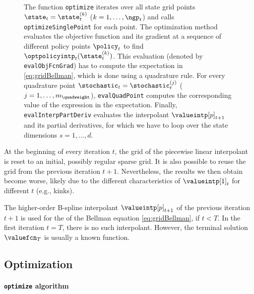 \begin{figure}
{    The function \texttt{optimize} iterates over all state grid points
    $\state_t = \state_t^{(k)}$ ($k = 1, \dotsc, \ngp_t$)
    and calls \texttt{optimizeSinglePoint} for each point.
    The optimization method evaluates the objective function and
    its gradient at a sequence of different policy points $\policy_t$
    to find $\optpolicyintp_t(\state_t^{(k)})$.
    This evaluation (denoted by \texttt{evalObjFcnGrad})
    has to compute the expectation in \cref{eq:gridBellman},
    which is done using a quadrature rule.
    For every quadrature point $\stochastic_t = \stochastic_t^{(j)}$
    ($j = 1, \dotsc, m_{\quadweight}$),
    \texttt{evalQuadPoint} computes the corresponding value of
    the expression in the expectation.
    Finally, \texttt{evalInterpPartDeriv} evaluates the interpolant
    $\valueintp[p]_{t+1}$ and its partial derivatives,
    for which we have to loop over the state dimensions $s = 1, \dotsc, d$.%
  }%
  \label{fig:structureSolveValueFunction}%
\end{figure}

At the beginning of every iteration $t$,
the grid of the piecewise linear interpolant is reset
to an initial, possibly regular sparse grid.
It is also possible to reuse the grid from the
previous iteration $t + 1$.
Nevertheless, the results we then obtain become worse,
likely due to the different characteristics of $\valueintp[1]_t$
for different $t$ (e.g., kinks).

The higher-order B-spline interpolant
$\valueintp[p]_{t+1}$ of the previous iteration $t+1$ is used
for the \rhs of the Bellman equation \eqref{eq:gridBellman},
if $t < T$.
In the first iteration $t = T$,
there is no such interpolant.
However,
the terminal solution $\valuefcn_T$ is usually a known function.



\subsection{Optimization}
\label{sec:823optimization}

\paragraph{\texttt{optimize} algorithm}

